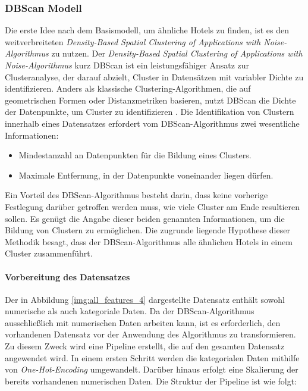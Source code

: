 \subsubsection{DBScan Modell}
\label{subsubsec:dbscan}
Die erste Idee nach dem Basismodell, um ähnliche Hotels zu finden, ist es den weitverbreiteten \emph{Density-Based Spatial Clustering of Applications with Noise-Algorithmus} zu nutzen. Der \emph{Density-Based Spatial Clustering of Applications with Noise-Algorithmus} kurz DBScan ist ein leistungsfähiger Ansatz zur Clusteranalyse, der darauf abzielt, Cluster in Datensätzen mit variabler Dichte zu identifizieren. Anders als klassische Clustering-Algorithmen, die auf geometrischen Formen oder Distanzmetriken basieren, nutzt DBScan die Dichte der Datenpunkte, um Cluster zu identifizieren \cite{6814687}.
\newline
\newline
Die Identifikation von Clustern innerhalb eines Datensatzes erfordert vom DBScan-Algorithmus zwei wesentliche Informationen:

\begin{itemize}
    \item Mindestanzahl an Datenpunkten für die Bildung eines Clusters.
    \item Maximale Entfernung, in der Datenpunkte voneinander liegen dürfen.
\end{itemize}

Ein Vorteil des DBScan-Algorithmus besteht darin, dass keine vorherige Festlegung darüber getroffen werden muss, wie viele Cluster am Ende resultieren sollen. Es genügt die Angabe dieser beiden genannten Informationen, um die Bildung von Clustern zu ermöglichen.
\newline
\newline
Die zugrunde liegende Hypothese dieser Methodik besagt, dass der DBScan-Algorithmus alle ähnlichen Hotels in einem Cluster zusammenführt.

\paragraph{Vorbereitung des Datensatzes} 
Der in Abbildung \ref{img:all_features_4} dargestellte Datensatz enthält sowohl numerische als auch kategoriale Daten. Da der DBScan-Algorithmus ausschließlich mit numerischen Daten arbeiten kann, ist es erforderlich, den vorhandenen Datensatz vor der Anwendung des Algorithmus zu transformieren. Zu diesem Zweck wird eine Pipeline erstellt, die auf den gesamten Datensatz angewendet wird. In einem ersten Schritt werden die kategorialen Daten mithilfe von \emph{One-Hot-Encoding} umgewandelt. Darüber hinaus erfolgt eine Skalierung der bereits vorhandenen numerischen Daten.
\newline
\newline
Die Struktur der Pipeline ist wie folgt:

